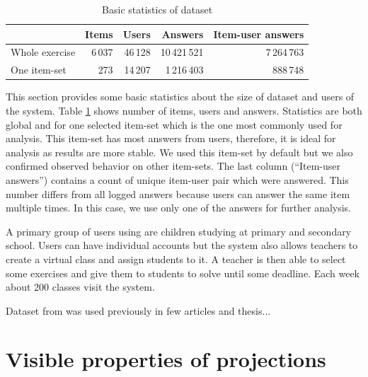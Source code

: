 \documentclass[
  digital, %
  table,   %
  nolof,     %
  nolot,     %
  nocover,
  color
]{fithesis3}
\begin{document}
\begin{table}
  \begin{tabular}{|l|r r r r|}
    \hline
     & Items & Users & Answers & Item-user answers \\
    \hline\hline
    Whole exercise & 6\,037 & 46\,128 & 10\,421\,521 & 7\,264\,763 \\
    \hline
    One item-set & 273 & 14\,207 & 1\,216\,403 & 888\,748 \\
    \hline
  \end{tabular}
  \caption{Basic statistics of dataset}
  \label{tab:basic-statistics}
\end{table}

This section provides some basic statistics about the size of dataset and users of the system. Table \ref{tab:basic-statistics} shows number of items, users and answers. Statistics are both global and for one selected item-set which is the one most commonly used for analysis. This item-set has most answers from users, therefore, it is ideal for analysis as results are more stable. We used this item-set by default but we also confirmed observed behavior on other item-sets. The last column (``Item-user answers'') contains a count of unique item-user pair which were answered. This number differs from all logged answers because users can answer the same item multiple times. In this case, we use only one of the answers for further analysis.


A primary group of users using \umimeCesky{} are children studying at primary and secondary school. Users can have individual accounts
but the system also allows teachers to create a virtual class and assign students to it. A teacher is then able to select some exercises and give them to students to solve until some deadline. Each week about 200 classes visit the system.


Dataset from \umimeCesky{} was used previously in few articles and thesis...


\section{Visible properties of projections}\label{visible-properties-of-projections}
\end{document}
